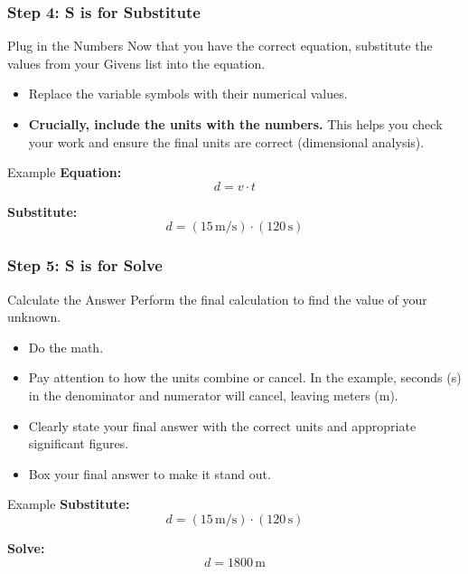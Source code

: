 \documentclass{beamer}
\begin{document}
\begin{frame}[allowframebreaks]
    \frametitle{Step 4: S is for Substitute}
    \begin{block}{Plug in the Numbers}
        Now that you have the correct equation, substitute the values from your \alert{Givens} list into the equation.
        \begin{itemize}
            \item Replace the variable symbols with their numerical values.
            \item \textbf{Crucially, include the units with the numbers.} This helps you check your work and ensure the final units are correct (dimensional analysis).
        \end{itemize}
    \end{block}
    \begin{exampleblock}{Example}
        \textbf{Equation:}
        \[ d = v \cdot t \]
        \vspace{1em}
        
        \textbf{Substitute:}
        \[ d = (15 \, \text{m/s}) \cdot (120 \, \text{s}) \]
    \end{exampleblock}
\end{frame}

\begin{frame}[allowframebreaks]
    \frametitle{Step 5: S is for Solve}
    \begin{block}{Calculate the Answer}
        Perform the final calculation to find the value of your unknown.
        \begin{itemize}
            \item Do the math.
            \item Pay attention to how the units combine or cancel. In the example, seconds (s) in the denominator and numerator will cancel, leaving meters (m).
            \item Clearly state your final answer with the correct units and appropriate significant figures.
            \item Box your final answer to make it stand out.
        \end{itemize}
    \end{block}
    \begin{exampleblock}{Example}
        \textbf{Substitute:}
        \[ d = (15 \, \text{m/s}) \cdot (120 \, \text{s}) \]
        \vspace{1em}
        
        \textbf{Solve:}
        \[ d = 1800 \, \text{m} \]
        \begin{center}
        \end{center}
    \end{exampleblock}
\end{frame}
\end{document}
